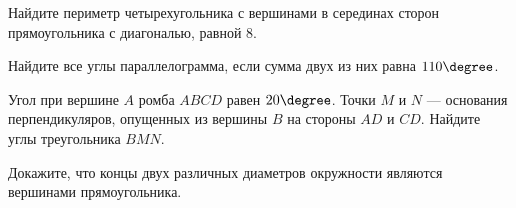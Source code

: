\begin{consultation}
	\begin{listofex}
		\item Найдите периметр четырехугольника с вершинами в серединах сторон прямоугольника с диагональю, равной \( 8 \).
		\item Найдите все углы параллелограмма, если сумма двух из них равна \( 110\degree \).
		\item Угол при вершине \( A \) ромба \( ABCD \) равен \( 20\degree \). Точки \( M \) и \( N \) --- основания перпендикуляров, опущенных из вершины \( B \) на стороны \( AD \) и \( CD \). Найдите углы треугольника \( BMN \).
		\item Докажите, что концы двух различных диаметров окружности являются вершинами прямоугольника.
		\item {}
	\end{listofex}
\end{consultation}
